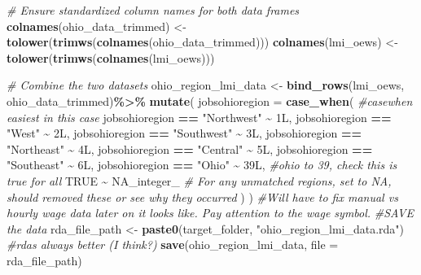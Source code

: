 \documentclass[
]{article}
\newenvironment{Shaded}{\begin{snugshade}}{\end{snugshade}}
\newcommand{\AttributeTok}[1]{\textcolor[rgb]{0.13,0.29,0.53}{#1}}
\newcommand{\CommentTok}[1]{\textcolor[rgb]{0.56,0.35,0.01}{\textit{#1}}}
\newcommand{\ConstantTok}[1]{\textcolor[rgb]{0.56,0.35,0.01}{#1}}
\newcommand{\DataTypeTok}[1]{\textcolor[rgb]{0.13,0.29,0.53}{#1}}
\newcommand{\DecValTok}[1]{\textcolor[rgb]{0.00,0.00,0.81}{#1}}
\newcommand{\FunctionTok}[1]{\textcolor[rgb]{0.13,0.29,0.53}{\textbf{#1}}}
\newcommand{\NormalTok}[1]{#1}
\newcommand{\OtherTok}[1]{\textcolor[rgb]{0.56,0.35,0.01}{#1}}
\newcommand{\SpecialCharTok}[1]{\textcolor[rgb]{0.81,0.36,0.00}{\textbf{#1}}}
\newcommand{\StringTok}[1]{\textcolor[rgb]{0.31,0.60,0.02}{#1}}
\begin{document}
\begin{Shaded}
\begin{Highlighting}[]
\CommentTok{\# Ensure standardized column names for both data frames}
\FunctionTok{colnames}\NormalTok{(ohio\_data\_trimmed) }\OtherTok{\textless{}{-}} \FunctionTok{tolower}\NormalTok{(}\FunctionTok{trimws}\NormalTok{(}\FunctionTok{colnames}\NormalTok{(ohio\_data\_trimmed)))}
\FunctionTok{colnames}\NormalTok{(lmi\_oews) }\OtherTok{\textless{}{-}} \FunctionTok{tolower}\NormalTok{(}\FunctionTok{trimws}\NormalTok{(}\FunctionTok{colnames}\NormalTok{(lmi\_oews)))}

\CommentTok{\# Combine the two datasets}
\NormalTok{ohio\_region\_lmi\_data }\OtherTok{\textless{}{-}} \FunctionTok{bind\_rows}\NormalTok{(lmi\_oews, ohio\_data\_trimmed)}\SpecialCharTok{\%\textgreater{}\%}
  \FunctionTok{mutate}\NormalTok{(}
    \AttributeTok{jobsohioregion =} \FunctionTok{case\_when}\NormalTok{( }\CommentTok{\#casewhen easiest in this case}
\NormalTok{      jobsohioregion }\SpecialCharTok{==} \StringTok{"Northwest"} \SpecialCharTok{\textasciitilde{}} \DecValTok{1}\DataTypeTok{L}\NormalTok{,}
\NormalTok{       jobsohioregion }\SpecialCharTok{==} \StringTok{"West"} \SpecialCharTok{\textasciitilde{}} \DecValTok{2}\DataTypeTok{L}\NormalTok{,}
\NormalTok{      jobsohioregion }\SpecialCharTok{==} \StringTok{"Southwest"} \SpecialCharTok{\textasciitilde{}} \DecValTok{3}\DataTypeTok{L}\NormalTok{,}
\NormalTok{      jobsohioregion }\SpecialCharTok{==} \StringTok{"Northeast"} \SpecialCharTok{\textasciitilde{}} \DecValTok{4}\DataTypeTok{L}\NormalTok{,}
\NormalTok{      jobsohioregion }\SpecialCharTok{==} \StringTok{"Central"} \SpecialCharTok{\textasciitilde{}} \DecValTok{5}\DataTypeTok{L}\NormalTok{,}
\NormalTok{      jobsohioregion }\SpecialCharTok{==} \StringTok{"Southeast"} \SpecialCharTok{\textasciitilde{}} \DecValTok{6}\DataTypeTok{L}\NormalTok{,}
\NormalTok{      jobsohioregion }\SpecialCharTok{==} \StringTok{"Ohio"} \SpecialCharTok{\textasciitilde{}} \DecValTok{39}\DataTypeTok{L}\NormalTok{, }\CommentTok{\#ohio to 39, check this is true for all}
      \ConstantTok{TRUE} \SpecialCharTok{\textasciitilde{}} \ConstantTok{NA\_integer\_}  \CommentTok{\# For any unmatched regions, set to NA, should removed these or see why they occurred}
\NormalTok{     )}
\NormalTok{    )}
\CommentTok{\#Will have to fix manual vs hourly wage data later on it looks like. Pay attention to the wage symbol. }
\CommentTok{\#SAVE the data}
\NormalTok{rda\_file\_path }\OtherTok{\textless{}{-}} \FunctionTok{paste0}\NormalTok{(target\_folder, }\StringTok{"ohio\_region\_lmi\_data.rda"}\NormalTok{) }\CommentTok{\#rda\textquotesingle{}s always better (I think?)}
\FunctionTok{save}\NormalTok{(ohio\_region\_lmi\_data, }\AttributeTok{file =}\NormalTok{ rda\_file\_path)}
\end{Highlighting}
\end{Shaded}
\end{document}
